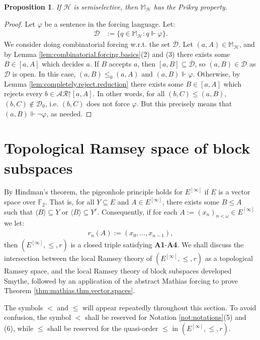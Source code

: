 \documentclass[10pt,a4paper]{amsart}
\theoremstyle{plain}
\numberwithin{equation}{section}
\newtheorem{proposition}[theorem]{Proposition}
\theoremstyle{definition}
\renewcommand{\c}[1]{\langle #1 \rangle}
\renewcommand{\bar}[1]{\overline{#1}}
\newcommand{\cal}{\mathcal}
\newcommand{\forces}{\Vdash}
\newcommand{\restrictedto}{\mathord{\upharpoonright}}
\renewcommand{\H}{\cal{H}}
\newcommand{\D}{\cal{D}}
\begin{document}
\begin{proposition}
\label{prop:semiselective.implies.Prikry}
    If $\H$ is semiselective, then $\mathbb{M}_\H$ has the Prikry property.
\end{proposition}

\begin{proof}
    Let $\varphi$ be a sentence in the forcing language. Let:
    \begin{align*}
        \D &:= \{q \in \mathbb{M}_\H : q \forces \varphi\}.
    \end{align*}
    We consider doing combinatorial forcing w.r.t. the set $\bar{\D}$. Let $(a,A) \in \mathbb{M}_\H$, and by Lemma \ref{lem:combinatorial.forcing.basics}(2) and (3) there exists some $B \in [a,A]$ which decides $a$. If $B$ accepts $a$, then $[a,B] \subseteq \bar{\D}$, so $(a,B) \in \D$ as $\D$ is open. In this case, $(a,B) \leq_0 (a,A)$ and $(a,B) \forces \varphi$. Otherwise, by Lemma \ref{lem:completely.reject.reduction} there exists some $B \in [a,A]$ which rejects every $b \in \cal{AR}\restrictedto[a,A]$. In other words, for all $(b,C) \leq (a,B)$, $(b,C) \notin \D_0$, i.e. $(b,C)$ does not force $\varphi$. But this precisely means that $(a,B) \forces \neg\varphi$, as needed.
\end{proof}

\section{Topological Ramsey space of block subspaces}
\label{sec:TRS.block.subspaces}
By Hindman's theorem, the pigeonhole principle holds for $E^{[\infty]}$ if $E$ is a vector space over $\mathbb{F}_2$. That is, for all $Y \subseteq E$ and $A \in E^{[\infty]}$, there exists some $B \leq A$ such that $\c{B} \subseteq Y$ or $\c{B} \subseteq Y^c$. Consequently, if for each $A := (x_n)_{n<\omega} \in E^{[\infty]}$ we let:
\begin{align*}
    r_n(A) := (x_0,\dots,x_{n-1}),
\end{align*}
then $(E^{[\infty]},\leq,r)$ is a closed triple satisfying \textbf{A1}-\textbf{A4}. We shall discuss the intersection between the local Ramsey theory of $(E^{[\infty]},\leq,r)$ as a topological Ramsey space, and the local Ramsey theory of block subspaces developed Smythe, followed by an application of the abstract Mathias forcing to prove Theorem \ref{thm:mathias.thm.vector.spaces}.

The symbols $<$ and $\leq$ will appear repeatedly throughout this section. To avoid confusion, the symbol $<$ shall be reserved for Notation \ref{not:notations}(5) and (6), while $\leq$ shall be reserved for the quasi-order $\leq$ in $(E^{[\infty]},\leq,r)$. 
\end{document}
